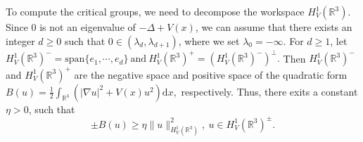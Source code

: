 \documentclass[12pt]{amsart}
\numberwithin{equation}{section}
\theoremstyle{definition}
\begin{document}
To compute the critical groups, we need to decompose the workspace $H^{1}_{V}(\mathbb{R}^3)$. Since $0$ is not an eigenvalue of $-\Delta+V(x)$, we can assume that there exists an integer $d\geq0$ such that $0\in(\lambda_{d},\lambda_{d+1})$, where we set $\lambda_{0}=-\infty$. For $d\geq1$, let $H^{1}_{V}(\mathbb{R}^3)^{-}=\mbox{span}\{e_1,\cdots,e_d\}\ \mbox{and}\  H^{1}_{V}(\mathbb{R}^3)^{+}=(H^{1}_{V}(\mathbb{R}^3)^{-})^{\perp}.$  Then $H^{1}_{V}(\mathbb{R}^3)^{-}$ and $H^{1}_{V}(\mathbb{R}^3)^{+}$ are the negative space and positive space of the quadratic form $ B(u)=\frac{1}{2}\int_{\mathbb{R}^3}\left(|\nabla u|^{2}+V(x)u^{2}\right)\text{d}x,$ respectively. Thus, there exits a constant $\eta>0$, such that
\begin{equation}\label{eq22}
\pm B(u)\geq\eta\|u\|_{H^{1}_{V}(\mathbb{R}^3)}^{2},\ u\in  H^{1}_{V}(\mathbb{R}^3)^{\pm}.
\end{equation}
\end{document}
